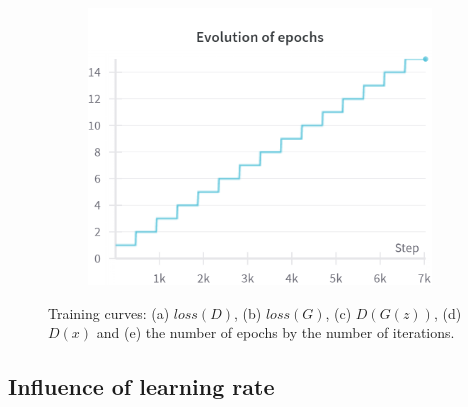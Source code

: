 \begin{figure}[H]
    \begin{subfigure}{0.45\textwidth}
        \centering
        \includegraphics[width=0.95\linewidth]{init/epochs.png}
        \caption{}
        \label{subfig:init/epochs}
    \end{subfigure}%

    \caption{Training curves: (a) $loss(D)$, (b) $loss(G)$, (c) $D(G(z))$, (d) $D(x)$ and (e) the number of epochs by the number of iterations.}
    \label{fig:init_losses}
\end{figure}

\subsection{Influence of learning rate} \label{appendix:gan_lr}


